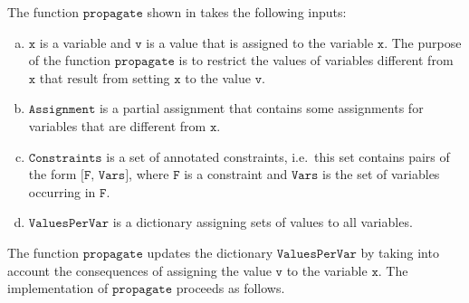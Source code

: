 \noindent
The function $\texttt{propagate}$ shown in  takes the following inputs:
\begin{enumerate}[(a)]
\item $\texttt{x}$ is a variable and $\texttt{v}$ is a value that is assigned to the variable $\texttt{x}$.
      The purpose of the function  $\texttt{propagate}$ is to restrict the values of variables different from
      $\texttt{x}$ that result from setting $\texttt{x}$ to the value $\texttt{v}$.
\item $\texttt{Assignment}$ is a partial assignment that contains some assignments for variables that are
      different from $\texttt{x}$.
\item $\texttt{Constraints}$ is a set of annotated constraints, i.e.~this set contains pairs of the form 
      $\texttt{[F, Vars]}$, where $\texttt{F}$ is a constraint and $\texttt{Vars}$ is the set of
      variables occurring in $\texttt{F}$.
\item $\texttt{ValuesPerVar}$ is a dictionary assigning sets of values to all variables.
\end{enumerate}
The function $\texttt{propagate}$ updates the dictionary $\texttt{ValuesPerVar}$ by taking into account the
consequences of assigning the value $\texttt{v}$ to the variable $\texttt{x}$.  The implementation of
$\texttt{propagate}$ proceeds as follows.
